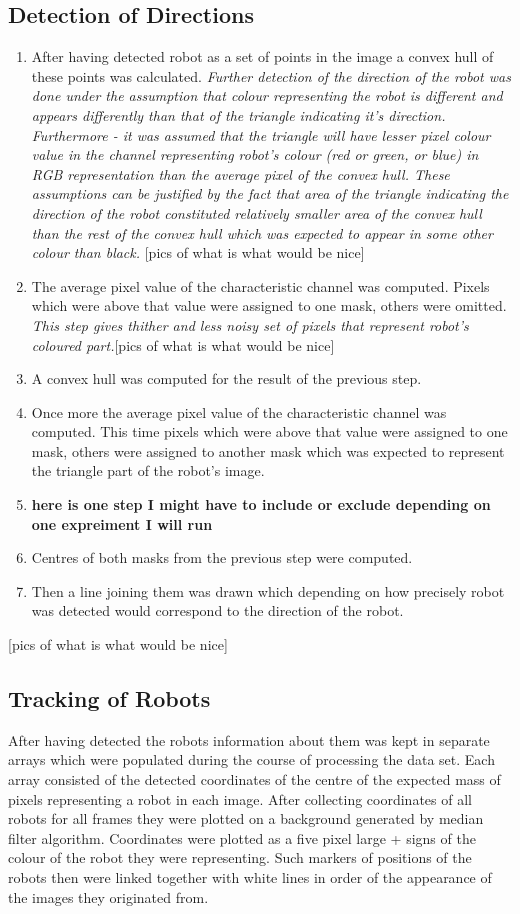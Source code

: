 \documentclass[10pt,a4paper,twocolumn]{article}
\begin{document}
\subsection{Detection of Directions}
\begin{enumerate}
\item After having detected robot as a set of points in the image a convex hull of these points was calculated.
\textit{Further detection of the direction of the robot was done under the assumption that colour representing the robot is different and appears differently than that of the triangle indicating it's direction. Furthermore - it was assumed that the triangle will have lesser pixel colour value in the channel representing robot's colour (red or green, or blue) in RGB representation than the average pixel of the convex hull. These assumptions can be justified by the fact that area of the triangle indicating the direction of the robot constituted relatively smaller area of the convex hull than the rest of the convex hull which was expected to appear in some other colour than black. }[pics of what is what would be nice]
\item The average pixel value of the characteristic  channel was computed. Pixels which were above that value were assigned to one mask, others were omitted. 
\textit{This step gives thither and less noisy set of pixels that represent robot's coloured part.}[pics of what is what would be nice]
\item A convex hull was computed for the result of the previous step. 
\item Once more the average pixel value of the characteristic channel was computed. This time pixels which were above that value were assigned to one mask, others were assigned to another mask which was expected to represent the triangle part of the robot's image. 
\item \textbf{here is one step I might have to include or exclude depending on one expreiment I will run} 
\item Centres of both masks from the previous step were computed. 
\item Then a line joining them was drawn which depending on how precisely robot was detected would correspond to the direction of the robot.
\end{enumerate} 
[pics of what is what would be nice]

\subsection{Tracking of Robots}
After having detected the robots information about them was kept in separate arrays which were populated during the course of processing the data set. Each array consisted of  the detected coordinates of the centre of the expected mass of pixels  representing a robot  in each image. After collecting coordinates of  all robots for all frames they were plotted on a background generated by median filter algorithm. Coordinates were plotted as a five pixel large + signs of the colour of the robot they were representing. Such markers of positions of the robots then were linked together with white lines in order of the appearance of the images they originated from. 
\end{document}
